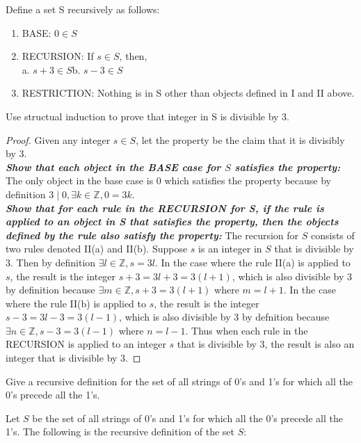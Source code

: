 \documentclass[12pt,letterpaper, onecolumn]{exam}
\begin{document}
\begin{questions}
\begin{solution}
	\end{solution}
	\setcounter{question}{10}\question Define a set S recursively as follows:
		\begin{enumerate}[label=\Roman*.]
		\item BASE: $0\in S$
		\item RECURSION: If $s\in S$, then,\\
		a. $s+3 \in S$\hspace*{2.5cm}b. $s-3\in S$
		\item RESTRICTION: Nothing is in S other than objects defined in I and II above.
	\end{enumerate}
	Use structual induction to prove that integer in S is divisible by 3.
	\begin{solution}
		\begin{proof}
		Given any integer $s\in S$, let the property be the claim that it is divisibly by 3.\\
		\textit{\textbf{Show that each object in the BASE case for $S$ satisfies the property:}} The only object in the base case is $0$ which satisfies the property because by definition $3\mid 0,  \exists k\in\mathbb{Z},  0=3k$.\\
			\textit{\textbf{Show that for each rule in the RECURSION for S, if the rule is applied to an object in S that satisfies the property, then the objects defined by the rule also satisfy the property:}} The recursion for $S$ consists of two rules denoted II(a) and II(b). Suppose $s$ is an integer in $S$ that is divisible by 3. Then by definition $\exists l \in\mathbb{Z}, s=3l$. In the case where the rule II(a) is applied to $s$, the result is the integer $s+3=3l+3=3(l+1)$, which is also divisible by 3 by definition because $\exists m \in\mathbb{Z}, s+3=3(l+1)$ where $m=l+1$. In the case where the rule II(b) is applied to $s$, the result is the integer $s-3=3l-3=3(l-1)$, which is also divisible by 3 by defnition because $\exists n\in\mathbb{Z}, s-3=3(l-1)$ where $n=l-1$. Thus when each rule in the RECURSION is applied to an integer $s$ that is divisible by 3, the result is also an integer that is divisible by 3.
	\end{proof}
	\end{solution}
	\setcounter{question}{15}\question Give a recursive definition for the set of all strings of 0's and 1's for which all the 0's precede all the 1's.
	\begin{solution}
		Let $S$ be the set of all strings of 0's and 1's for which all the 0's precede all the 1's. The following is the recursive definition of the set $S$:

\end{solution}
\end{questions}
\end{document}
